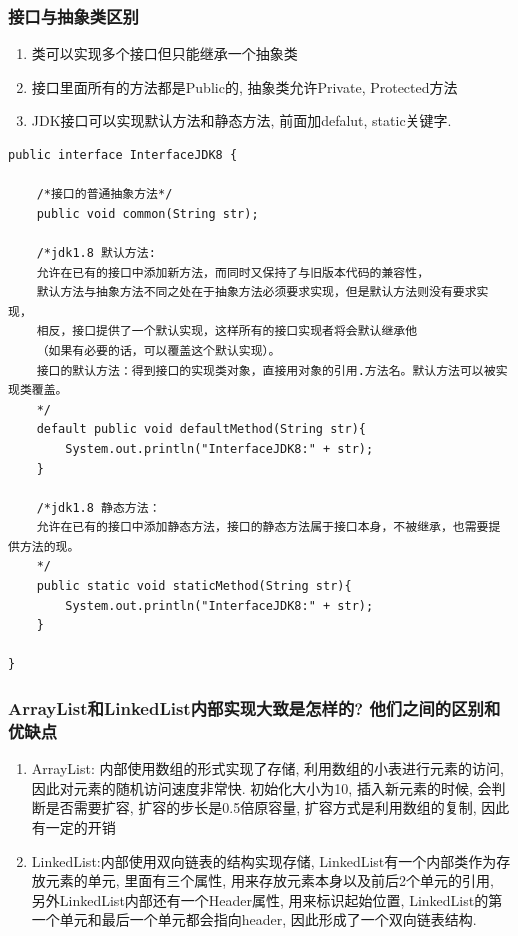 \documentclass[UTF8]{ctexart}
\begin{document}
\subsubsection{接口与抽象类区别}
\begin{enumerate}
	\item 类可以实现多个接口但只能继承一个抽象类
	\item 接口里面所有的方法都是Public的, 抽象类允许Private, Protected方法
	\item JDK接口可以实现默认方法和静态方法, 前面加defalut, static关键字.
\end{enumerate}
\begin{lstlisting}
public interface InterfaceJDK8 {
	
	/*接口的普通抽象方法*/
	public void common(String str);
	
	/*jdk1.8 默认方法:
	允许在已有的接口中添加新方法，而同时又保持了与旧版本代码的兼容性，
	默认方法与抽象方法不同之处在于抽象方法必须要求实现，但是默认方法则没有要求实现，
	相反，接口提供了一个默认实现，这样所有的接口实现者将会默认继承他
	（如果有必要的话，可以覆盖这个默认实现）。
	接口的默认方法：得到接口的实现类对象，直接用对象的引用.方法名。默认方法可以被实现类覆盖。
	*/
	default public void defaultMethod(String str){
		System.out.println("InterfaceJDK8:" + str);
	}
	
	/*jdk1.8 静态方法：
	允许在已有的接口中添加静态方法，接口的静态方法属于接口本身，不被继承，也需要提供方法的现。
	*/
	public static void staticMethod(String str){
		System.out.println("InterfaceJDK8:" + str);
	}
	
}
\end{lstlisting}
\subsubsection{ArrayList和LinkedList内部实现大致是怎样的? 他们之间的区别和优缺点}
\begin{enumerate}
	\item ArrayList: 内部使用数组的形式实现了存储, 利用数组的小表进行元素的访问, 因此对元素的随机访问速度非常快. 初始化大小为10, 插入新元素的时候, 会判断是否需要扩容, 扩容的步长是0.5倍原容量, 扩容方式是利用数组的复制, 因此有一定的开销
	\item LinkedList:内部使用双向链表的结构实现存储, LinkedList有一个内部类作为存放元素的单元, 里面有三个属性, 用来存放元素本身以及前后2个单元的引用, 另外LinkedList内部还有一个Header属性, 用来标识起始位置, LinkedList的第一个单元和最后一个单元都会指向header, 因此形成了一个双向链表结构.
\end{enumerate}
\end{document}
